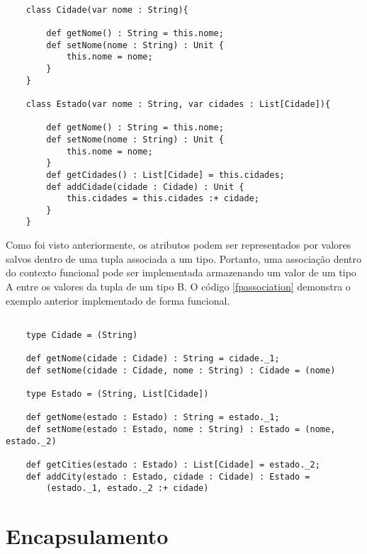 \begin{lstlisting}[caption={Exemplo de associação entre classes},label=ooassociation]
    
    class Cidade(var nome : String){

        def getNome() : String = this.nome;
        def setNome(nome : String) : Unit {
            this.nome = nome;
        }
    }

    class Estado(var nome : String, var cidades : List[Cidade]){

        def getNome() : String = this.nome;
        def setNome(nome : String) : Unit {
            this.nome = nome;
        }
        def getCidades() : List[Cidade] = this.cidades;
        def addCidade(cidade : Cidade) : Unit {
            this.cidades = this.cidades :+ cidade;
        }
    }

\end{lstlisting}

Como foi visto anteriormente, os atributos 
podem ser representados por valores salvos 
dentro de uma tupla associada a um tipo. 
Portanto, uma associação dentro do contexto 
funcional pode ser implementada armazenando 
um valor de um tipo A entre os valores da tupla 
de um tipo B. O código \ref{fpassociation} 
demonstra o exemplo anterior implementado 
de forma funcional.

\begin{lstlisting}[caption={Exemplo de associação no contexto funcional},label=fpassociation]
    
    type Cidade = (String)
    
    def getNome(cidade : Cidade) : String = cidade._1;
    def setNome(cidade : Cidade, nome : String) : Cidade = (nome)

    type Estado = (String, List[Cidade])
    
    def getNome(estado : Estado) : String = estado._1;
    def setNome(estado : Estado, nome : String) : Estado = (nome, estado._2)
    
    def getCities(estado : Estado) : List[Cidade] = estado._2;
    def addCity(estado : Estado, cidade : Cidade) : Estado =
        (estado._1, estado._2 :+ cidade)

\end{lstlisting}

\section{Encapsulamento}

